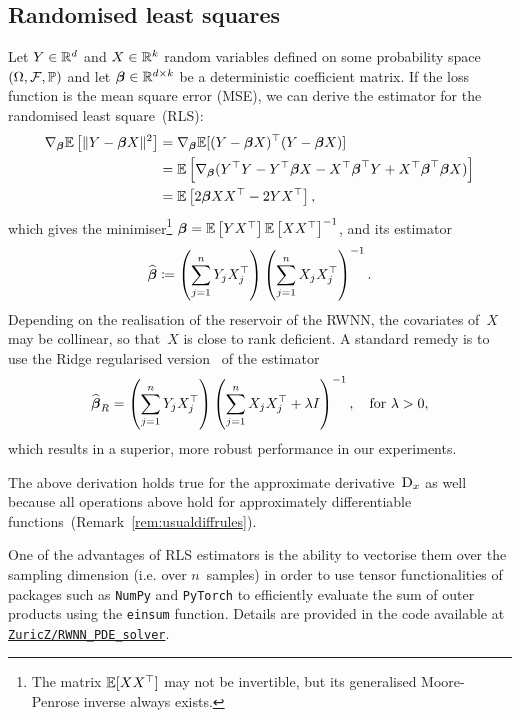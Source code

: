 \subsection{Randomised least squares}
\label{sec:randomizedLS}
Let $Y\in\mathbb{R}^d$ and $X\in\mathbb{R}^k$ random variables defined on some probability space $(\Omega, \mathcal{F}, \mathbb{P})$ and let $\boldsymbol{\beta}\in\mathbb{R}^{d\times k}$ be a deterministic coefficient matrix. 
If the loss function is the mean square error (MSE), we can derive the estimator for the randomised least square~(RLS):
\begin{align*}
    \nabla_{\boldsymbol{\beta}} \mathbb{E}\left[\|Y-\boldsymbol{\beta} X\|^2\right] &= \nabla_{\boldsymbol{\beta}} \mathbb{E}[(Y-\boldsymbol{\beta} X)^\top(Y-\boldsymbol{\beta} X)] \\ 
    &= \mathbb{E}\left[\nabla_{\boldsymbol{\beta}} (Y^\top Y - Y^\top \boldsymbol{\beta} X - X^\top\boldsymbol{\beta}^\top Y + X^\top\boldsymbol{\beta}^\top\boldsymbol{\beta} X)\right] \\
    &= \mathbb{E}\left[2\boldsymbol{\beta} XX^\top - 2YX^\top\right],
\end{align*}
which gives the minimiser\footnote{The matrix $\mathbb{E}[XX^\top]$ may not be invertible, but its generalised Moore-Penrose inverse always exists.}
$\boldsymbol{\beta} = \mathbb{E}\left[YX^\top\right] \mathbb{E}\left[XX^\top\right]^{-1}$,
and its estimator
\[
\widehat{\boldsymbol{\beta}} \coloneqq  \left(\sum^n_{j=1} Y_j X_{j}^{\top}\right)\left(\sum^n_{j=1} X_jX_j^\top\right)^{-1}.
\]
Depending on the realisation of the reservoir of the RWNN, the covariates of~$X$ may be collinear, 
so that~$X$ is close to rank deficient. 
A standard remedy is to use the Ridge regularised version~\cite{Hoerl1970RidgeProblems} of the estimator
\[
\widehat{\boldsymbol{\beta}}_R = \left(\sum^n_{j=1} Y_j X_{j}^{\top}\right)\left(\sum^n_{j=1} X_jX_j^\top+\lambda I\right)^{-1},
\quad \text{for } \lambda>0,
\]
which results in a superior, more robust performance in our experiments.
\begin{remark}
The above derivation holds true for the approximate derivative~$\mathrm{D}_{x}$ as well because all operations above hold for approximately differentiable functions~(Remark~\ref{rem:usualdiffrules}).
\end{remark}
\begin{remark}
One of the advantages of RLS estimators is the ability to vectorise them over the sampling dimension (i.e. over $n$~samples) in order to use tensor functionalities of packages such as \textup{\texttt{NumPy}} and \textup{\texttt{PyTorch}} to efficiently evaluate the sum of outer products using the \textup{\texttt{einsum}} function. Details are provided in the code available at \href{https://github.com/ZuricZ/RWNN_PDE_solver}{\textup{\texttt{ZuricZ/RWNN\_PDE\_solver}}}.
\end{remark}

